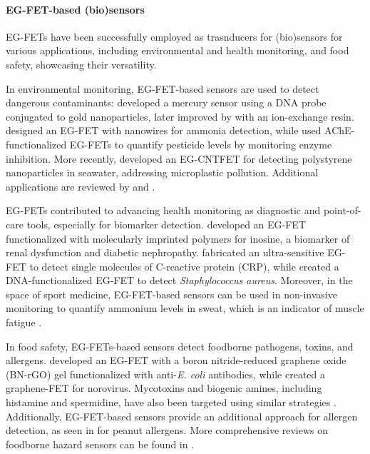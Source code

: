 \paragraph{EG-FET-based (bio)sensors}
EG-FETs have been successfully employed as trasnducers for (bio)sensors for
various applications, including environmental and health monitoring, and food
safety, showcasing their versatility.

In environmental monitoring, EG-FET-based sensors are used to detect dangerous
contaminants: \citet{knopfmacherHighly2014} developed a mercury sensor using a
DNA probe conjugated to gold nanoparticles, later improved by
\citet{alqahtaniBridged2023} with an ion-exchange resin.
\citet{singhFabrication2021} designed an EG-FET with  nanowires for
ammonia detection, while \citet{sasipongpanaExtended2017} used
AChE-functionalized EG-FETs to quantify pesticide levels by monitoring enzyme
inhibition. More recently, \citet{elliElectrolyteGated2024} developed an
EG-CNTFET for detecting polystyrene nanoparticles in seawater, addressing
microplastic pollution. Additional applications are reviewed by
\citet{pullanoEGFETBased2018} and \citet{elliFieldEffect2022}.

EG-FETs contributed to advancing health monitoring as diagnostic and
point-of-care tools, especially for biomarker detection.
\citet{iskierkoExtendedgate2015} developed an EG-FET functionalized with
molecularly imprinted polymers for inosine, a biomarker of renal dysfunction and
diabetic nephropathy. \citet{macchiaSelective2019} fabricated an ultra-sensitive
EG-FET to detect single molecules of C-reactive protein (CRP), while
\citet{purwidyantriColloidal2018} created a DNA-functionalized EG-FET to detect
\textit{Staphylococcus aureus}. Moreover, in the space of sport medicine,
EG-FET-based sensors can be used in non-invasive monitoring to quantify ammonium
levels in sweat, which is an indicator of muscle fatigue
\citep{chenInvolvement2020, petrelliFlexible2022, petrelliNovel2022,
petrelliMethod2023}.

In food safety, EG-FETs-based sensors detect foodborne pathogens, toxins, and
allergens. \citet{zaidanRapid2024} developed an EG-FET with a boron
nitride-reduced graphene oxide (BN-rGO) gel functionalized with anti-\textit{E.
coli} antibodies, while \citet{xiangInkjetPrinted2016} created a graphene-FET
for norovirus. Mycotoxins and biogenic amines, including histamine and
spermidine, have also been targeted using similar strategies
\citep{ahDetection2012, minamiExtendedgate2015, shkodraFlexible2021,
shkodraPolymeric2024}. Additionally, EG-FET-based sensors provide an additional
approach for allergen detection, as seen in \citet{kimUltrasensitive2022} for
peanut allergens. More comprehensive reviews on foodborne hazard sensors can be
found in \citet{bobrinetskiyAdvances2021, kourtiOptical2023}.
